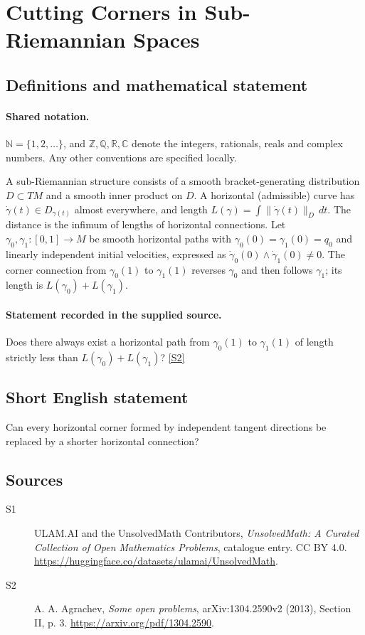 \documentclass[11pt]{article}
\newcommand{\sref}[2]{\hyperlink{source:#1:#2}{[S#2]}}
\begin{document}
\section{Cutting Corners in Sub-Riemannian Spaces}\label{statement}

\subsection{Definitions and mathematical statement}

\paragraph{Shared notation.}$\mathbb N=\{1,2,\ldots\}$, and $\mathbb Z,\mathbb Q,\mathbb R,\mathbb C$ denote the integers, rationals, reals and complex numbers. Any other conventions are specified locally.


A sub-Riemannian structure consists of a smooth bracket-generating distribution $D\subset TM$ and a smooth inner product on $D$. A horizontal (admissible) curve has $\dot\gamma(t)\in D_{\gamma(t)}$ almost everywhere, and length $L(\gamma)=\int\|\dot\gamma(t)\|_D\,dt$. The distance is the infimum of lengths of horizontal connections. Let $\gamma_0,\gamma_1:[0,1]\to M$ be smooth horizontal paths with $\gamma_0(0)=\gamma_1(0)=q_0$ and linearly independent initial velocities, expressed as $\dot\gamma_0(0)\wedge\dot\gamma_1(0)\ne0$. The corner connection from $\gamma_0(1)$ to $\gamma_1(1)$ reverses $\gamma_0$ and then follows $\gamma_1$; its length is $L(\gamma_0)+L(\gamma_1)$.
\paragraph{Statement recorded in the supplied source.}
Does there always exist a horizontal path from $\gamma_0(1)$ to $\gamma_1(1)$ of length strictly less than $L(\gamma_0)+L(\gamma_1)$? \sref{statement}{2}
\subsection{Short English statement}
Can every horizontal corner formed by independent tangent directions be replaced by a shorter horizontal connection?
\subsection{Sources}
\begin{description}
\item[\hypertarget{source:statement:1}{S1}] ULAM.AI and the UnsolvedMath Contributors, \emph{UnsolvedMath: A Curated Collection of Open Mathematics Problems}, catalogue entry. CC BY 4.0. \url{https://huggingface.co/datasets/ulamai/UnsolvedMath}.
\item[\hypertarget{source:statement:2}{S2}] A. A. Agrachev, \emph{Some open problems}, arXiv:1304.2590v2 (2013), Section II, p. 3. \url{https://arxiv.org/pdf/1304.2590}.
\end{description}
\label{end:statement}
\end{document}
